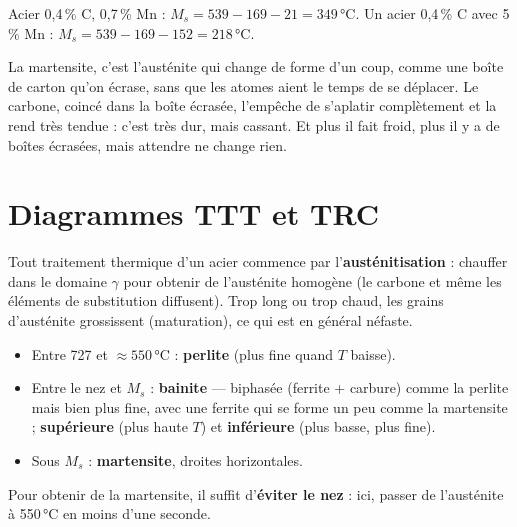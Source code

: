\begin{exbox}[title={Exemple chiffré (pas dans les diapositives)}]
Acier 0,4\,\% C, 0,7\,\% Mn : $M_s = 539 - 169 - 21 = 349$\,°C. Un acier 0,4\,\% C avec 5\,\% Mn :
$M_s = 539 - 169 - 152 = 218$\,°C.
\end{exbox}

\begin{goatbox}
La martensite, c'est l'austénite qui change de forme d'un coup, comme une boîte de carton qu'on
écrase, sans que les atomes aient le temps de se déplacer. Le carbone, coincé dans la boîte
écrasée, l'empêche de s'aplatir complètement et la rend très tendue : c'est très dur, mais
cassant. Et plus il fait froid, plus il y a de boîtes écrasées, mais attendre ne change rien.
\end{goatbox}

\section{Diagrammes TTT et TRC}

Tout traitement thermique d'un acier commence par l'\textbf{austénitisation} : chauffer dans le
domaine $\gamma$ pour obtenir de l'austénite homogène (le carbone et même les éléments de
substitution diffusent). Trop long ou trop chaud, les grains d'austénite grossissent (maturation),
ce qui est en général néfaste.


\begin{propbox}[title={Lire le TTT de l'acier eutectoïde}]
\begin{itemize}
  \item Entre 727 et $\approx 550$\,°C : \textbf{perlite} (plus fine quand $T$ baisse).
  \item Entre le nez et $M_s$ : \textbf{bainite} --- biphasée (ferrite + carbure) comme la perlite
        mais bien plus fine, avec une ferrite qui se forme un peu comme la martensite ;
        \textbf{supérieure} (plus haute $T$) et \textbf{inférieure} (plus basse, plus fine).
  \item Sous $M_s$ : \textbf{martensite}, droites horizontales.
\end{itemize}
Pour obtenir de la martensite, il suffit d'\textbf{éviter le nez} : ici, passer de l'austénite à
550\,°C en moins d'une seconde.
\end{propbox}

